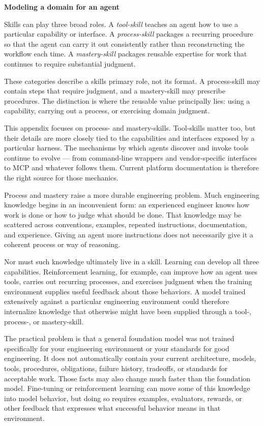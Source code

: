 

\textbf{Modeling a domain for an agent}

Skills can play three broad roles. A \emph{tool-skill} teaches an agent how to use a particular capability or interface. A \emph{process-skill} packages a recurring procedure so that the agent can carry it out consistently rather than reconstructing the workflow each time. A \emph{mastery-skill} packages reusable expertise for work that continues to require substantial judgment.

These categories describe a skill\textquotesingle s primary role, not its format. A process-skill may contain steps that require judgment, and a mastery-skill may prescribe procedures. The distinction is where the reusable value principally lies: using a capability, carrying out a process, or exercising domain judgment.

This appendix focuses on process- and mastery-skills. Tool-skills matter too, but their details are more closely tied to the capabilities and interfaces exposed by a particular harness. The mechanisms by which agents discover and invoke tools continue to evolve --- from command-line wrappers and vendor-specific interfaces to MCP and whatever follows them. Current platform documentation is therefore the right source for those mechanics.

Process and mastery raise a more durable engineering problem. Much engineering knowledge begins in an inconvenient form: an experienced engineer knows how work is done or how to judge what should be done. That knowledge may be scattered across conventions, examples, repeated instructions, documentation, and experience. Giving an agent more instructions does not necessarily give it a coherent process or way of reasoning.

Nor must such knowledge ultimately live in a skill. Learning can develop all three capabilities. Reinforcement learning, for example, can improve how an agent uses tools, carries out recurring processes, and exercises judgment when the training environment supplies useful feedback about those behaviors. A model trained extensively against a particular engineering environment could therefore internalize knowledge that otherwise might have been supplied through a tool-, process-, or mastery-skill.

The practical problem is that a general foundation model was not trained specifically for your engineering environment or your standards for good engineering. It does not automatically contain your current architecture, models, tools, procedures, obligations, failure history, tradeoffs, or standards for acceptable work. Those facts may also change much faster than the foundation model. Fine-tuning or reinforcement learning can move some of this knowledge into model behavior, but doing so requires examples, evaluators, rewards, or other feedback that expresses what successful behavior means in that environment.


